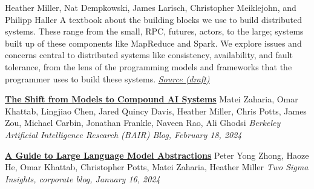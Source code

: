 \documentclass[9pt]{article}
\begin{document}



\bigskip
{}

\newline\noindent Heather Miller, Nat Dempkowski, James Larisch,
\newline\noindent Christopher Meiklejohn, and Philipp Haller
\smallskip
\newline\noindent A textbook about the building blocks we use to build distributed systems. These range from the small, RPC, futures, actors, to the large; systems built up of these components like MapReduce and Spark. We explore issues and concerns central to distributed systems like consistency, availability, and fault tolerance, from the lens of the programming models and frameworks that the programmer uses to build these systems.
\newline\noindent\href{https://github.com/heathermiller/dist-prog-book}{\em Source (draft)}
\bigskip


\bigskip

\noindent\href{https://bair.berkeley.edu/blog/2024/02/18/compound-ai-systems/}{\bf The Shift from Models to Compound AI Systems}
\newline\noindent Matei Zaharia, Omar Khattab, Lingjiao Chen, Jared Quincy Davis,\vspace{-0.03in}  \newline\noindent Heather Miller, Chris Potts, James Zou, Michael Carbin,\vspace{-0.03in}
\newline\noindent Jonathan Frankle, Naveen Rao, Ali Ghodsi
\newline\noindent\emph{Berkeley Artificial Intelligence Research (BAIR) Blog, February 18, 2024}
\bigskip

\noindent\href{https://www.twosigma.com/articles/a-guide-to-large-language-model-abstractions/}{\bf A Guide to Large Language Model Abstractions}
\newline\noindent Peter Yong Zhong, Haoze He, Omar Khattab, Christopher Potts,\vspace{-0.03in}
\newline\noindent Matei Zaharia, Heather Miller
\newline\noindent\emph{Two Sigma Insights, corporate blog, January 16, 2024}
\bigskip
\end{document}
